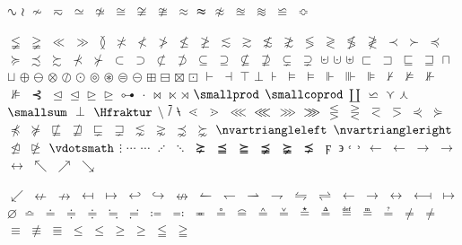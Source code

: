 \documentclass[captions=tableheading]{scrartcl}
\begin{document}
$\sinewave$
$\wr$
$\nsim$
$\eqsim$
$\simeq$
$\nsime$
$\cong$
$\simneqq$
$\ncong$
$\approx$
$\thickapprox$
$\napprox$
$\approxeq$
$\approxident$
$\backcong$
$\Bumpeq$

$\lneqq$
$\gneqq$
$\ll$
$\gg$
$\between$
$\nasymp$
$\nless$
$\ngtr$
$\nleq$
$\ngeq$
$\lesssim$
$\gtrsim$
$\nlesssim$
$\ngtrsim$
$\lessgtr$
$\gtrless$
$\nlessgtr$
$\ngtrless$
$\prec$
$\succ$
$\preccurlyeq$
$\succcurlyeq$
$\precsim$
$\succsim$
$\nprec$
$\nsucc$
$\subset$
$\supset$
$\nsubset$
$\nsupset$
$\subseteq$
$\supseteq$
$\nsubseteq$
$\nsupseteq$
$\subsetneq$
$\supsetneq$
$\cupleftarrow$
$\cupdot$
$\uplus$
$\sqsubset$
$\sqsupset$
$\sqsubseteq$
$\sqsupseteq$
$\sqcap$
$\sqcup$
$\oplus$
$\ominus$
$\otimes$
$\oslash$
$\odot$
$\circledcirc$
$\circledast$
$\circledequal$
$\circleddash$
$\boxplus$
$\boxminus$
$\boxtimes$
$\boxdot$
$\vdash$
$\dashv$
$\top$
$\bot$
$\assert$
$\models$
$\vDash$
$\Vdash$
$\Vvdash$
$\VDash$
$\nvdash$
$\nvDash$
$\nVdash$
$\nVDash$
$\prurel$
$\trianglelefteq$
$\unlhd$
$\trianglerighteq$
$\unrhd$
$\origof$
$\cdot$
$\bowtie$
$\ltimes$
$\rtimes$
$\smallprod$
$\smallcoprod$ $\amalg$
$\backsimeq$
$\curlyvee$
$\curlywedge$
$\smallsum$
$\perp$
$\Hfraktur$
$\setminus$
$\dsol$
$\rsolbar$
$\lessdot$
$\gtrdot$
$\lll$ $\llless$
$\ggg$ $\gggtr$
$\lesseqgtr$
$\gtreqless$
$\eqless$
$\eqgtr$
$\curlyeqprec$
$\curlyeqsucc$
$\npreccurlyeq$
$\nsucccurlyeq$
$\nsqsubseteq$
$\nsqsupseteq$
$\sqsubsetneq$
$\sqsupsetneq$
$\lnsim$
$\gnsim$
$\precnsim$
$\succnsim$
$\nvartriangleleft$
$\nvartriangleright$
$\ntrianglelefteq$
$\ntrianglerighteq$
$\vdotsmath$
$\vdots$
$\unicodecdots$
$\cdots$
$\adots$
$\ddots$
$\succneq$
$\preceqq$
$\succeqq$
$\precneqq$
$\succneqq$
$\precneq$
$\digamma$
$\backepsilon$
$\lhook$
$\rhook$
$\leftarrow$
$\gets$
$\rightarrow$ $\to$
 $\leftrightarrow$
$\nwarrow$
$\nearrow$
$\searrow$

$\swarrow$
$\nleftarrow$
$\nrightarrow$
$\mapsfrom$
$\mapsto$
$\hookleftarrow$
$\hookrightarrow$
$\nleftrightarrow$
$\leftharpoonup$
$\leftharpoondown$
$\rightharpoonup$
$\rightharpoondown$
$\leftrightharpoons$
$\rightleftharpoons$
$\longleftarrow$
$\longrightarrow$
$\longleftrightarrow$
$\longmapsfrom$
$\longmapsto$
$\diameter$
$\bumpeq$
$\doteq$
$\Doteq$ $\doteqdot$
$\fallingdotseq$
$\risingdotseq$
$\coloneq$
$\eqcolon$
$\eqcirc$
$\circeq$
$\arceq$
$\wedgeq$
$\veeeq$
$\stareq$
$\triangleq$
$\eqdef$
$\measeq$
$\questeq$
$\ne$ $\neq$
$\equiv$
$\nequiv$
$\Equiv$
$\leq$ $\le$
$\geq$ $\ge$
$\leqq$
$\geqq$
\end{document}
